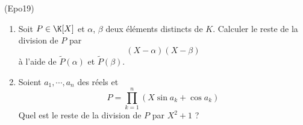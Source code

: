 \begin{tiny}(Epo19)\end{tiny}
\begin{enumerate}
 \item Soit $P\in \K[X]$ et $\alpha$, $\beta$ deux éléments distincts de $K$. Calculer le reste de la division de $P$ par
\begin{displaymath}
(X-\alpha)(X-\beta) 
\end{displaymath}
 à l'aide de $\widetilde{P}(\alpha)$ et $\widetilde{P}(\beta)$.
\item Soient $a_1,\cdots,a_n$ des réels et
\begin{displaymath}
 P = \prod_{k=1}^{n}(X\sin a_k + \cos a_k)
\end{displaymath}
Quel est le reste de la division de $P$ par $X^2+1$ ?
\end{enumerate}